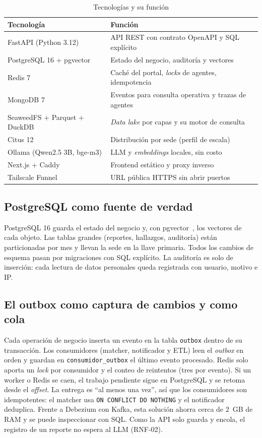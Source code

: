 \documentclass[conference]{IEEEtran}
\begin{document}
\begin{table}[t]
\centering
\caption{Tecnologías y su función}
\label{tab:stack}
\small\begin{tabular}{@{}p{}p{}@{}}
\toprule
Tecnología & Función \\
\midrule
FastAPI (Python 3.12) & API REST con contrato OpenAPI y SQL explícito \\
PostgreSQL 16 + pgvector & Estado del negocio, auditoría y vectores \\
Redis 7 & Caché del portal, \emph{locks} de agentes, idempotencia \\
MongoDB 7 & Eventos para consulta operativa y trazas de agentes \\
SeaweedFS + Parquet + DuckDB & \emph{Data lake} por capas y su motor de consulta \\
Citus 12 & Distribución por sede (perfil de escala) \\
Ollama (Qwen2.5 3B, bge-m3) & LLM y \emph{embeddings} locales, sin costo \\
Next.js + Caddy & Frontend estático y proxy inverso \\
Tailscale Funnel & URL pública HTTPS sin abrir puertos \\
\bottomrule
\end{tabular}
\end{table}

\subsection{PostgreSQL como fuente de verdad}
PostgreSQL 16 guarda el estado del negocio y, con pgvector~\cite{pgvector}, los vectores de cada objeto. Las tablas grandes (reportes, hallazgos, auditoría) están particionadas por mes y llevan la sede en la llave primaria. Todos los cambios de esquema pasan por migraciones con SQL explícito. La auditoría es solo de inserción: cada lectura de datos personales queda registrada con usuario, motivo e IP.

\subsection{El outbox como captura de cambios y como cola}
Cada operación de negocio inserta un evento en la tabla \texttt{outbox} dentro de su transacción. Los consumidores (matcher, notificador y ETL) leen el \emph{outbox} en orden y guardan en \texttt{consumidor\_outbox} el último evento procesado. Redis solo aporta un \emph{lock} por consumidor y el conteo de reintentos (tres por evento). Si un worker o Redis se caen, el trabajo pendiente sigue en PostgreSQL y se retoma desde el \emph{offset}. La entrega es ``al menos una vez'', así que los consumidores son idempotentes: el matcher usa \texttt{ON CONFLICT DO NOTHING} y el notificador deduplica. Frente a Debezium con Kafka, esta solución ahorra cerca de 2~GB de RAM y se puede inspeccionar con SQL. Como la API solo guarda y encola, el registro de un reporte no espera al LLM (RNF-02).
\end{document}
